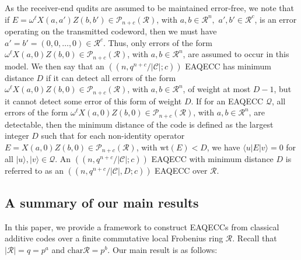 \documentclass{article}
\theoremstyle{remark}
\theoremstyle{definition}
\numberwithin{equation}{section}
\begin{document}
As the receiver-end qudits are assumed to be maintained error-free, we note that if $E=\omega^{\ell} X(a,a')Z(b,b') \in \mathcal{P}_{n+c}(\mathcal{R})$, with $a,b \in \mathcal{R}^{n},$ $a',b' \in \mathcal{R}^{c}$, is an error operating on the transmitted codeword, then we must have $a'=b'=(0,0,\ldots,0)\in \mathcal{R}^{c}.$ Thus, only errors of the form $\omega^{\ell} X(a,0)Z(b,0) \in \mathcal{P}_{n+c}(\mathcal{R})$, with $a,b \in \mathcal{R}^{n}$, are assumed to occur in this model. We then say that an $((n,q^{n+c}/|\mathcal{C}| ;c))$ EAQECC has minimum distance $D$ if it can detect all errors of the form $\omega^{\ell} X(a,0)Z(b,0) \in \mathcal{P}_{n+c}(\mathcal{R})$, with $a,b \in \mathcal{R}^{n}$,  of weight at most $D-1$, but it cannot detect some error of this form of weight $D.$  If for an EAQECC $\mathcal{Q}$, all errors of the form $\omega^{\ell} X(a,0)Z(b,0) \in \mathcal{P}_{n+c}(\mathcal{R})$, with $a,b \in \mathcal{R}^{n}$, are detectable, then the minimum distance of the code is defined as the largest integer $D$ such that for each non-identity operator $E= X(a,0)Z(b,0) \in \mathcal{P}_{n+c}(\mathcal{R})$, with $\text{wt}(E) < D$, we have $\langle u | E | v \rangle=0$ for all $|u \rangle,|v \rangle \in \mathcal{Q}$. An $((n,q^{n+c}/|\mathcal{C}| ;c))$ EAQECC with minimum distance $D$ is referred to as an $((n,q^{n+c}/|\mathcal{C}|,D ;c))$ EAQECC over $\mathcal{R}$. 


\subsection{A summary of our main results}
In this paper, we provide a framework to construct EAQECCs from classical additive codes over a finite  commutative local Frobenius ring $\mathcal{R}$. Recall that $|\mathcal{R}| = q = p^a$ and $\text{char}\mathcal{R} = p^b$. Our main result  is as follows:
\end{document}
